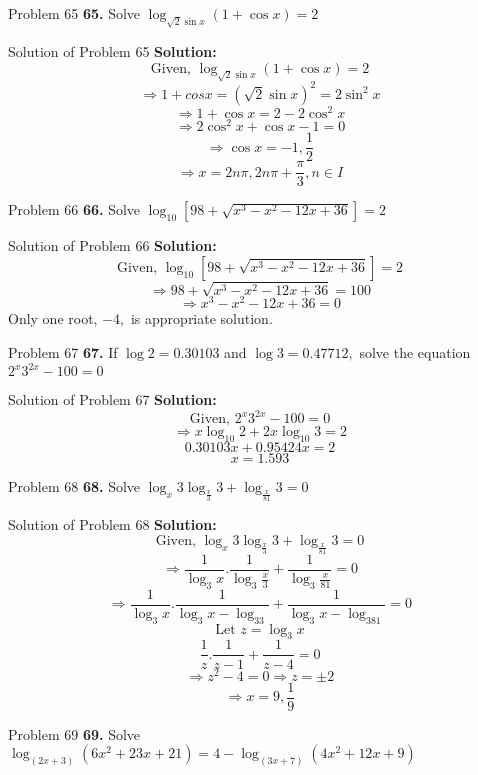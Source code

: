 \documentclass[aspectratio=1610,8pt]{beamer}
\begin{document}
\begin{frame}{Problem 65}
  \textbf{65.} Solve $\log_{\sqrt{2}\sin x}(1 + \cos x) = 2$
\end{frame}
\begin{frame}{Solution of Problem 65}
  \textbf{Solution:} $$\text{Given,~}\log_{\sqrt{2}\sin x}(1 + \cos x) = 2$$
  $$\Rightarrow 1 + cos x = (\sqrt{2}\sin x)^2 = 2\sin^2x$$
  $$\Rightarrow 1 + \cos x = 2 - 2\cos^2x$$
  $$\Rightarrow 2\cos^2x + \cos x - 1= 0$$
  $$\Rightarrow \cos x = -1, \frac{1}{2}$$
  $$\Rightarrow x = 2n\pi, 2n\pi + \frac{\pi}{3}, n\in I$$
\end{frame}
\begin{frame}{Problem 66}
  \textbf{66.} Solve $\log_{10}[98+ \sqrt{x^3 - x^2 - 12x + 36}] = 2$
\end{frame}
\begin{frame}{Solution of Problem 66}
  \textbf{Solution:} $$\text{Given,~}\log_{10}[98+ \sqrt{x^3 - x^2 - 12x + 36}] = 2$$
  $$\Rightarrow 98 + \sqrt{x^3 - x^2 - 12x + 36} = 100$$
  $$\Rightarrow x^3 - x^2 - 12x + 36 = 0$$
  Only one root, $-4,$ is appropriate solution.
\end{frame}
\begin{frame}{Problem 67}
  \textbf{67.} If $\log 2 = 0.30103$ and $\log 3 = 0.47712,$ solve the equation $2^x3^{2x} - 100 = 0$
\end{frame}
\begin{frame}{Solution of Problem 67}
  \textbf{Solution:} $$\text{Given,~}2^x3^{2x} - 100 = 0$$
  $$\Rightarrow x\log_{10}2 + 2x\log_{10}3 = 2$$
  $$0.30103x + 0.95424x = 2$$
  $$x = 1.593$$
\end{frame}
\begin{frame}{Problem 68}
  \textbf{68.} Solve $\log_x3\log_{\frac{x}{3}}3 + \log_{\frac{x}{81}}3 = 0$
\end{frame}
\begin{frame}{Solution of Problem 68}
  \textbf{Solution:} $$\text{Given,~}\log_x3\log_{\frac{x}{3}}3 + \log_{\frac{x}{81}}3 = 0$$
  $$\Rightarrow \frac{1}{\log_3x}.\frac{1}{\log_3\frac{x}{3}} + \frac{1}{\log_3\frac{x}{81}} = 0$$
  $$\Rightarrow \frac{1}{\log_3x}.\frac{1}{\log_3x - \log_33} + \frac{1}{\log_3x - \log_381} = 0$$
  $$\text{Let~}z = \log_3x$$
  $$\frac{1}{z}.\frac{1}{z -1} + \frac{1}{z - 4} = 0$$
  $$\Rightarrow z^2 - 4 = 0 \Rightarrow z = \pm 2$$
  $$\Rightarrow x = 9, \frac{1}{9}$$
\end{frame}
\begin{frame}{Problem 69}
  \textbf{69.} Solve $\log_{(2x + 3)}(6x^2 + 23x + 21) = 4 - \log_{(3x + 7)}(4x^2 + 12x + 9)$
\end{frame}
\end{document}
